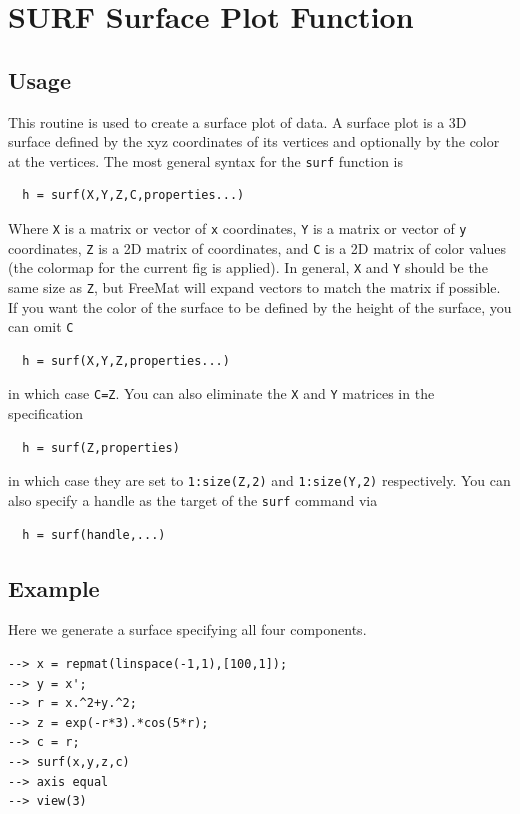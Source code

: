 \section{SURF Surface Plot Function}

\subsection{Usage}

This routine is used to create a surface plot of data.  A 
surface plot is a 3D surface defined by the xyz coordinates
of its vertices and optionally by the color at the vertices.
The most general syntax for the \verb|surf| function is
\begin{verbatim}
  h = surf(X,Y,Z,C,properties...)
\end{verbatim}
Where \verb|X| is a matrix or vector of \verb|x| coordinates, \verb|Y| is a
matrix or vector of \verb|y| coordinates, \verb|Z| is a 2D matrix of
coordinates, and \verb|C| is a 2D matrix of color values (the colormap
for the current fig is applied).  In general, \verb|X| and \verb|Y| should
be the same size as \verb|Z|, but FreeMat will expand vectors to match
the matrix if possible.
If you want the color of the surface to be defined by the height
of the surface, you can omit \verb|C|
\begin{verbatim}
  h = surf(X,Y,Z,properties...)
\end{verbatim}
in which case \verb|C=Z|.  You can also eliminate the \verb|X| and \verb|Y|
matrices in the specification
\begin{verbatim}
  h = surf(Z,properties)
\end{verbatim}
in which case they are set to \verb|1:size(Z,2)| and \verb|1:size(Y,2)|
respectively.
You can also specify a handle as the target of the \verb|surf| command
via
\begin{verbatim}
  h = surf(handle,...)
\end{verbatim}
\subsection{Example}

Here we generate a surface specifying all four components.
\begin{verbatim}
--> x = repmat(linspace(-1,1),[100,1]);
--> y = x';
--> r = x.^2+y.^2;
--> z = exp(-r*3).*cos(5*r);
--> c = r;
--> surf(x,y,z,c)
--> axis equal
--> view(3)
\end{verbatim}



